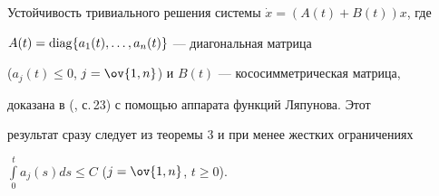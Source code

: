 \begin{exam}


Устойчивость тривиального решения системы $\Dot x=(A(t)+B(t))x$, где 


$A(t)=\operatorname{diag}\{a_1(t),\dotsc,a_n(t)\}$ --- диагональная матрица 


($a_j(t)\le0$, $j=\ov{1,n}$) и $B(t)$ --- кососимметрическая матрица, 


доказана в (\cite{4}, с.\,23) с помощью аппарата функций Ляпунова. Этот 


результат сразу следует из теоремы 3 и при менее жестких ограничениях 


$\int\limits^t_0 a_j(s)ds\le C$ ($j=\ov{1,n}$, $t\ge0$).


\end{exam}





